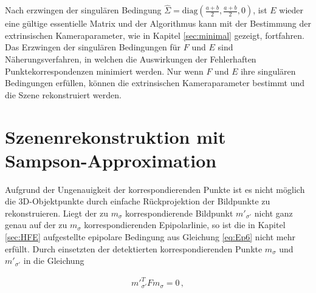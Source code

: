 Nach erzwingen der singulären Bedingung $\hat{\Sigma} = \text{diag}(\frac{a+b}{2},\frac{a+b}{2},0)$, ist $E$ wieder eine gültige essentielle Matrix und der Algorithmus kann mit der Bestimmung der extrinsischen Kameraparameter, wie in Kapitel \ref{sec:minimal} gezeigt, fortfahren.\\

Das Erzwingen der singulären Bedingungen für $F$ und $E$ sind Näherungsverfahren, in welchen die Auswirkungen der Fehlerhaften Punktekorrespondenzen minimiert werden. Nur wenn $F$ und $E$ ihre singulären Bedingungen erfüllen, können die extrinsischen Kameraparameter bestimmt und die Szene rekonstruiert werden\cite{HZ}.

\section{Szenenrekonstruktion mit Sampson-Approximation}
\label{sec:sampson}

Aufgrund der Ungenauigkeit der korrespondierenden Punkte ist es nicht möglich die 3D-Objektpunkte durch einfache Rückprojektion der Bildpunkte zu rekonstruieren. Liegt der zu $m_\sigma$ korrespondierende Bildpunkt $m'_{\sigma'}$ nicht ganz genau auf der zu $m_\sigma$ korrespondierenden Epipolarlinie, so ist die in Kapitel \ref{sec:HFE} aufgestellte epipolare Bedingung aus Gleichung \ref{eq:Ep6} nicht mehr erfüllt. Durch einsetzten der detektierten korrespondierenden Punkte $m_\sigma$ und $m'_{\sigma'}$ in die Gleichung 

\begin{gather}
	m'^T_{\sigma'}Fm_\sigma = 0 \, ,
\end{gather}

